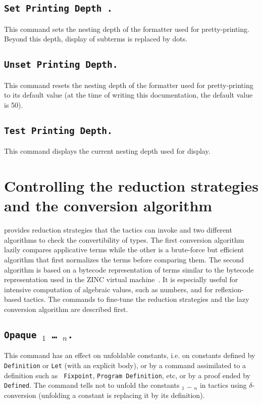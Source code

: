 \subsection[\tt Set Printing Depth {\integer}.]{\tt Set Printing Depth {\integer}.}
This command sets the nesting depth of the formatter used for
pretty-printing. Beyond this depth, display of subterms is replaced by
dots. 

\subsection[\tt Unset Printing Depth.]{\tt Unset Printing Depth.}
This command resets the nesting depth of the formatter used for
pretty-printing to its default value (at the
time of writing this documentation, the default value is 50).

\subsection[\tt Test Printing Depth.]{\tt Test Printing Depth.}
This command displays the current nesting depth used for display.


\section{Controlling the reduction strategies and the conversion algorithm}
\label{Controlling reduction strategy}

{\Coq} provides reduction strategies that the tactics can invoke and
two different algorithms to check the convertibility of types.
The first conversion algorithm lazily
compares applicative terms while the other is a brute-force but efficient
algorithm that first normalizes the terms before comparing them.  The
second algorithm is based on a bytecode representation of terms
similar to the bytecode representation used in the ZINC virtual
machine~\cite{Leroy90}. It is especially useful for intensive
computation of algebraic values, such as numbers, and for reflexion-based
tactics. The commands to fine-tune the reduction strategies and the
lazy conversion algorithm are described first.

\subsection[\tt Opaque \qualid$_1$ {\dots} \qualid$_n$.]{\tt Opaque \qualid$_1$ {\dots} \qualid$_n$.\label{Opaque}} 
This command has an effect on unfoldable constants, i.e. 
on constants defined by {\tt Definition} or {\tt Let} (with an explicit
body), or by a command assimilated to a definition such as {\tt
Fixpoint}, {\tt Program Definition}, etc, or by a proof ended by {\tt
Defined}. The command tells not to unfold
the constants {\qualid$_1$} {\dots} {\qualid$_n$} in tactics using
$\delta$-conversion (unfolding a constant is replacing it by its
definition).

